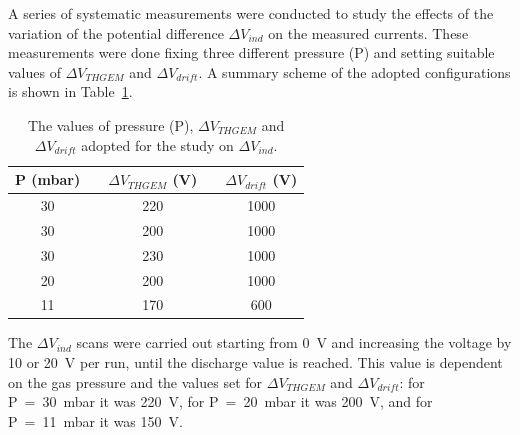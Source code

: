 \documentclass[a4paper, 11 pt]{article}
\newcommand{\Vind}{$\Delta V_{ind}$}
\newcommand{\Vthgem}{$\Delta V_{THGEM}$}
\newcommand{\Vdrift}{$ \Delta V_{drift}$}
\begin{document}
A series of systematic measurements were conducted to study the effects of the variation of the potential difference \Vind{} on the measured currents.
These measurements were done fixing three different pressure (P) and setting suitable values of \Vthgem{} and \Vdrift.
A summary scheme of the adopted configurations is shown in Table~\ref{tab:FULLTHGEM_vind}.
\begin{table} [b!]
	\begin{center}
		\renewcommand{\arraystretch}{1.2}
		\begin{tabular} {ccccc}
			P (mbar) & & \Vthgem{} (V) & & \Vdrift{} (V)\\
			\toprule[0.1em]
			30	& &	220	& &	1000 \\
			30	& &	200	& &	1000 \\
			30	& &	230	& &	1000 \\
			20	& &	200	& & 1000 \\
			11	& & 170	& & 600 \\
			
			\bottomrule[0.1em]
		\end{tabular}
	\end{center}
	\caption{The values of pressure (P), \Vthgem{} and \Vdrift{} adopted for the study on \Vind.} \label{tab:FULLTHGEM_vind}
\end{table}
%			
The \Vind{} scans were carried out starting from 0~V and increasing the voltage by 10 or 20~V per run, until the discharge value is reached.
This value is dependent on the gas pressure and the values set for \Vthgem{} and \Vdrift: for P~=~30~mbar it was 220~V, for P~=~20~mbar it was 200~V, and for P~=~11~mbar it was 150~V.
\end{document}
